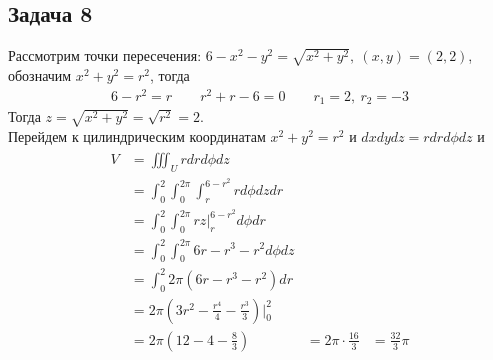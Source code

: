 \subsection*{Задача 8}
	Рассмотрим точки пересечения: $6 - x^2 - y^2 = \sqrt{x^2 + y^2},\ (x,y) = (2,2)$, обозначим $x^2 + y^2 = r^2$, тогда
	\begin{gather*}
		6 - r^2 = r\qquad r^2 + r - 6 = 0\qquad r_1 = 2,\ r_2 = -3
	\end{gather*}
	Тогда $z = \sqrt{x^2 + y^2} = \sqrt{r^2} = 2$.\\
	Перейдем к цилиндрическим координатам $x^2 + y^2 = r^2$ и $dxdydz = rdrd\phi dz$ и
	\begin{gather*}
	\begin{aligned}
		V & = \iiint_U r dr d\phi dz\\
		& = \int_{0}^{2} \int_{0}^{2\pi} \int_{r}^{6 - r^2} r d\phi dz dr\\
		& = \int_{0}^{2} \int_{0}^{2\pi} rz \bigg|_{r}^{6-r^2} d\phi dr\\
		& = \int_{0}^{2} \int_{0}^{2\pi} 6r-r^3-r^2 d\phi dz\\
		& = \int_{0}^{2} 2\pi(6r-r^3-r^2) dr\\
		& = 2\pi (3r^2 - \frac{r^4}{4} - \frac{r^3}{3}) \bigg|_{0}^{2}\\
		& = 2\pi (12-4-\frac{8}{3})
		& = 2\pi \cdot \frac{16}{3}
		& = \frac{32}{3}\pi
	\end{aligned} 
	\end{gather*}
\vskip 0.4in


